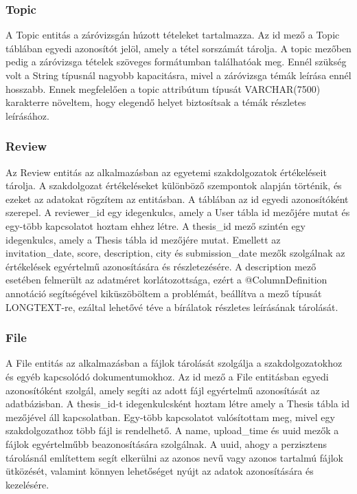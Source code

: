 \subsubsection{Topic}

A Topic entitás a záróvizsgán húzott tételeket tartalmazza. Az id mező a Topic táblában egyedi azonosítót jelöl, amely a tétel sorszámát tárolja. A topic mezőben pedig a záróvizsga tételek szöveges formátumban találhatóak meg. Ennél szükség volt a String típusnál nagyobb kapacitásra, mivel a záróvizsga témák leírása ennél hosszabb. Ennek megfelelően a topic attribútum típusát VARCHAR(7500) karakterre növeltem, hogy elegendő helyet biztosítsak a témák részletes leírásához.

\subsubsection{Review}

Az Review entitás az alkalmazásban az egyetemi szakdolgozatok értékeléseit tárolja. A szakdolgozat értékeléseket különböző szempontok alapján történik, és ezeket az adatokat rögzítem az entitásban. A táblában az id egyedi azonosítóként szerepel. A reviewer\_id egy idegenkulcs, amely a User tábla id mezőjére mutat és egy-több kapcsolatot hoztam ehhez létre. A thesis\_id mező szintén egy idegenkulcs, amely a Thesis tábla id mezőjére mutat. Emellett az invitation\_date, score, description, city és submission\_date mezők szolgálnak az értékelések egyértelmű azonosítására és részletezésére. A description mező esetében felmerült az adatméret korlátozottsága, ezért a @ColumnDefinition annotáció segítségével kiküszöböltem a problémát, beállítva a mező típusát LONGTEXT-re, ezáltal lehetővé téve a bírálatok részletes leírásának tárolását.

\subsubsection{File}

A File entitás az alkalmazásban a fájlok tárolását szolgálja a szakdolgozatokhoz és egyéb kapcsolódó dokumentumokhoz. Az id mező a File entitásban egyedi azonosítóként szolgál, amely segíti az adott fájl egyértelmű azonosítását az adatbázisban. A thesis\_id-t idegenkulcsként hoztam létre amely a Thesis tábla id mezőjével áll kapcsolatban. Egy-több kapcsolatot valósítottam meg, mivel egy szakdolgozathoz több fájl is rendelhető. A name, upload\_time és uuid mezők a fájlok egyértelműbb beazonosítására szolgálnak. A uuid, ahogy a perzisztens tárolásnál említettem segít elkerülni az azonos nevű vagy azonos tartalmú fájlok ütközését, valamint könnyen lehetőséget nyújt az adatok azonosítására és kezelésére.

